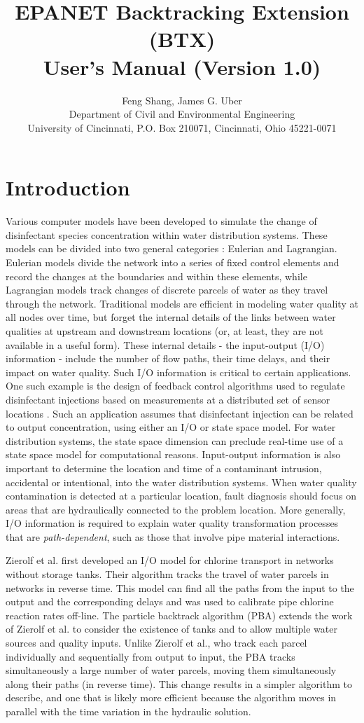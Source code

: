 \documentclass[12pt,letterpaper]{article}
\title{\large EPANET Backtracking Extension (BTX)\\User's Manual (Version 1.0)}
\author{\normalsize Feng Shang, James G. Uber\\
\small Department of Civil and Environmental Engineering \\
\small University of Cincinnati, P.O. Box 210071, Cincinnati, Ohio
45221-0071}
\begin{document}
\maketitle
\section*{Introduction}
Various computer models have been developed to simulate the change
of disinfectant species concentration within water distribution
systems. These models can be divided into two general categories
\cite{Rossman96}: Eulerian and Lagrangian. Eulerian models divide
the network into a series of fixed control elements and record the
changes at the boundaries and within these elements, while
Lagrangian models track changes of discrete parcels of water as they
travel through the network. Traditional models are efficient in
modeling water quality at all nodes over time, but forget the
internal details of the links between water qualities at upstream
and downstream locations (or, at least, they are not available in a
useful form). These internal details - the input-output (I/O)
information - include the number of flow paths, their time delays,
and their impact on water quality. Such I/O information is critical
to certain applications. One such example is the design of feedback
control algorithms used to regulate disinfectant injections based on
measurements at a distributed set of sensor locations
\cite{wzicc00}. Such an application assumes that disinfectant
injection can be related to output concentration, using either an
I/O or state space model. For water distribution systems, the state
space dimension can preclude real-time use of a state space model
for computational reasons. Input-output information is also
important to determine the location and time of a contaminant
intrusion, accidental or intentional, into the water distribution
systems. When water quality contamination is detected at a
particular location, fault diagnosis should focus on areas that are
hydraulically connected to the problem location. More generally, I/O
information is required to explain water quality transformation
processes that are {\it path-dependent}, such as those that involve
pipe material interactions.

Zierolf et al. \cite{ZPU98} first developed an I/O model for
chlorine transport in networks without storage tanks. Their
algorithm tracks the travel of water parcels in networks in reverse
time. This model can find all the paths from the input to the output
and the corresponding delays and was used to calibrate pipe chlorine
reaction rates off-line. The particle backtrack algorithm (PBA)
\cite{shang2002} extends the work of Zierolf et al. to consider the
existence of tanks and to allow multiple water sources and quality
inputs. Unlike Zierolf et al., who track each parcel individually
and sequentially from output to input, the PBA tracks simultaneously
a large number of water parcels, moving them simultaneously along
their paths (in reverse time). This change results in a simpler
algorithm to describe, and one that is likely more efficient because
the algorithm moves in parallel with the time variation in the
hydraulic solution.
\end{document}

